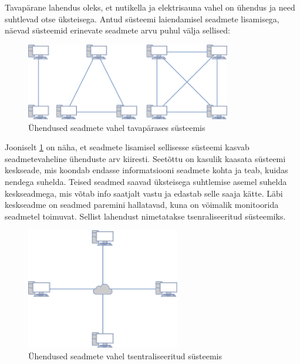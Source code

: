 \documentclass[12pt]{article}
\begin{document}
  Tavapärane lahendus oleks, et nutikella ja elektrisauna vahel on ühendus ja
  need suhtlevad otse üksteisega. Antud süsteemi laiendamisel seadmete lisamisega,
  näevad süsteemid erinevate seadmete arvu puhul välja sellised:
  

  \begin{figure} [ht] %
  \begin{center}
  \includegraphics[width=0.8\textwidth]{decentralizedCommunication}
  \caption{Ühendused seadmete vahel tavapärases süsteemis}
  \label{fig:decentralizedCommunication}
  \end{center}
  \end{figure}
  \FloatBarrier
  
  
  Jooniselt \ref{fig:decentralizedCommunication} on näha, et seadmete lisamisel sellisesse
  süsteemi kasvab seadmetevaheline ühenduste arv kiiresti. 
  Seetõttu on kasulik kaasata süsteemi keskseade, mis koondab endasse informatsiooni seadmete kohta
  ja teab, kuidas nendega suhelda. Teised seadmed saavad üksteisega suhtlemise asemel suhelda
  keskseadmega, mis võtab info saatjalt vastu ja edastab selle saaja kätte.
  Läbi keskseadme on seadmed paremini hallatavad, kuna on vöimalik monitoorida seadmetel
  toimuvat.
  Sellist lahendust nimetatakse tsenraliseeritud süsteemiks.

  \begin{figure} [ht] %
  \begin{center}
  \includegraphics[width=0.6\textwidth]{centralizedCommunication}
  \caption{Ühendused seadmete vahel tsentraliseeritud süsteemis}
  \label{fig:centralizedCommunication}
  \end{center}
  \end{figure}
  \FloatBarrier
  
\end{document}
